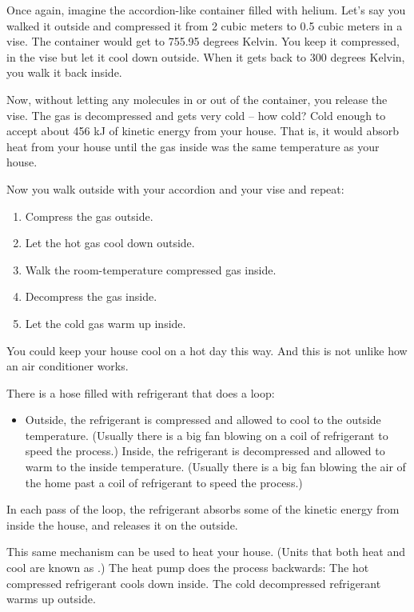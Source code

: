 Once again, imagine the accordion-like container filled with helium.  Let's say you walked it outside and compressed it from 2 cubic meters to 0.5 cubic meters in a vise.  The container would get to 755.95 degrees Kelvin.  You keep it compressed, in the vise  but let it cool down outside.  When it gets back to 300 degrees Kelvin,  you walk it back inside.

Now,  without letting any molecules in or out of the container,  you release the vise.  The gas is decompressed and gets very cold -- how cold?  Cold enough to accept about 456 kJ of kinetic energy from your house.  That is,  it would absorb heat from your house until the gas inside was the same temperature as your house.

Now you walk outside with your accordion and your vise and repeat:
\begin{enumerate}
\item Compress the gas outside.
\item Let the hot gas cool down outside.
\item Walk the room-temperature compressed gas inside.
\item Decompress the gas inside.
\item Let the cold gas warm up inside.
\end{enumerate}

You could keep your house cool on a hot day this way.  And this is not unlike how an air conditioner works.

There is a hose filled with refrigerant that does a loop:  
\begin{itemize}
\item Outside,  the refrigerant is compressed and allowed to cool to the outside temperature.  (Usually there is a big fan blowing on a coil of refrigerant to speed the process.)
Inside,  the refrigerant is decompressed and allowed to warm to the inside temperature.  (Usually there is a big fan blowing the air of the home past a coil of refrigerant to speed the process.)
\end{itemize}

In each pass of the loop,  the refrigerant absorbs some of the kinetic energy from inside the house, and releases it on the outside.

This same mechanism can be used to heat your house.  (Units that both heat and cool are known as .)  
The heat pump does the process backwards:  The hot compressed refrigerant cools down inside.  The cold decompressed refrigerant warms up outside.

